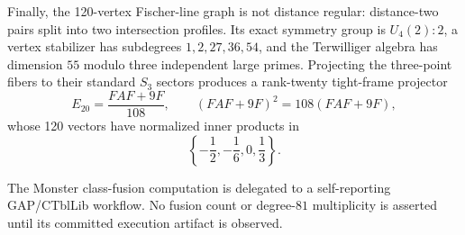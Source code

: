 Finally, the 120-vertex Fischer-line graph is not distance regular: distance-two pairs split into two intersection profiles. Its exact symmetry group is $U_4(2){:}2$, a vertex stabilizer has subdegrees $1,2,27,36,54$, and the Terwilliger algebra has dimension $55$ modulo three independent large primes. Projecting the three-point fibers to their standard $S_3$ sectors produces a rank-twenty tight-frame projector
\[
E_{20}=\frac{FAF+9F}{108},
\qquad (FAF+9F)^2=108(FAF+9F),
\]
whose 120 vectors have normalized inner products in
\[
\left\{-\frac12,-\frac16,0,\frac13\right\}.
\]

The Monster class-fusion computation is delegated to a self-reporting GAP/CTblLib workflow. No fusion count or degree-$81$ multiplicity is asserted until its committed execution artifact is observed.
